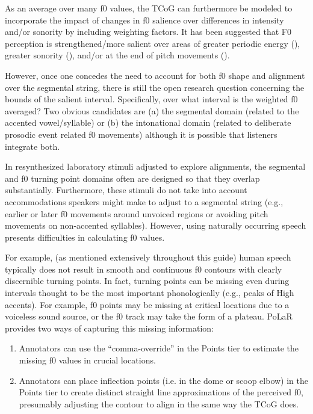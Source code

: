 As an average over many f0 values, the TCoG can furthermore be modeled to incorporate the impact of changes in f0 salience over differences in intensity and/or sonority by including weighting factors.  It has been suggested that F0 perception is strengthened\slash more salient over areas of greater periodic energy (\citealt{albert-18}), greater sonority (\citealt{barnes-14}), and/or at the end of  pitch movements (\citealt{dalessandro-95}). 

However, once one concedes the need to account for both f0 shape and alignment over the segmental string, there is  still the open research question concerning the bounds of the salient interval. Specifically, over what interval is the weighted f0 averaged?  Two obvious candidates are (a) the segmental domain (related to the accented vowel\slash syllable) or (b) the intonational domain (related to deliberate prosodic event related f0 movements) although it is possible that listeners integrate both.

In resynthesized laboratory stimuli adjusted to explore alignments, the segmental and f0 turning point domains often are designed so that they overlap substantially.  Furthermore, these stimuli do not take into account accommodations speakers might make to adjust to a segmental string (e.g., earlier or later f0 movements around unvoiced regions or avoiding pitch movements on non-accented syllables). However, using naturally occurring speech presents difficulties in calculating f0 values.

For example,  (as mentioned extensively throughout this guide) human speech typically does not result in smooth and continuous f0 contours with clearly discernible turning points.  In fact, turning points can be missing even during intervals thought to be the most important phonologically (e.g., peaks of High accents). For example, f0 points may be missing at critical locations due to a voiceless sound source, or the f0 track may take the form of a plateau.  PoLaR provides two ways of capturing this missing information: 

\begin{enumerate}
	\item Annotators can use the “comma-override” in the Points tier to estimate the missing f0 values in crucial locations.
	\item Annotators can place inflection points (i.e. in the dome or scoop elbow) in the Points tier to create distinct straight line approximations of the perceived f0, presumably adjusting the contour to align in the same way the TCoG does.
\end{enumerate}

